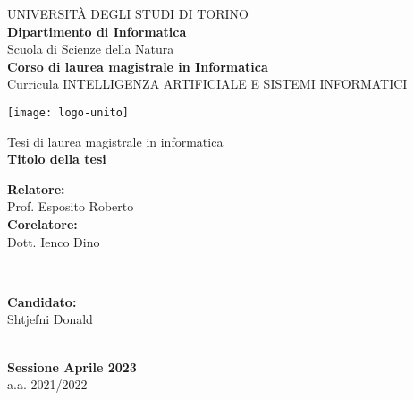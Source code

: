 \begin{titlepage}
  \begin{center}
      {\large \uppercase{Università degli studi di Torino}}\\[0.6cm]
      {\large \bf Dipartimento di Informatica}\\[0.6cm]
      {Scuola di Scienze della Natura}\\[0.6cm]
      {\large \bf Corso di laurea magistrale in Informatica}\\[0.5cm]
      {Curricula INTELLIGENZA ARTIFICIALE E SISTEMI INFORMATICI}\\[0.5cm]
      
      \vspace{0.1cm}
      \begin{center}
          \texttt{[image: logo-unito]}
      \end{center}
      \vspace{0.3cm}
      
      {Tesi di laurea magistrale in informatica}\\[1cm]
      {\huge \bf Titolo della tesi}\\[2.0cm]
      
     \begin{minipage}{0.4\textwidth}
         \begin{flushleft} \large
             \textbf{Relatore:}\\
             {Prof. Esposito Roberto}\\
             \textbf{Corelatore:}\\
             {Dott. Ienco Dino}
         \end{flushleft}
     \end{minipage}
     ~
     \begin{minipage}{0.4\textwidth}
         \begin{flushright} \large
             \textbf{Candidato:} \\
             {Shtjefni Donald} \\
         \end{flushright}
     \end{minipage}\\[1cm]
     {\bf Sessione Aprile 2023}\\
     {a.a. 2021/2022}
     \clearpage
  \end{center}
\end{titlepage}